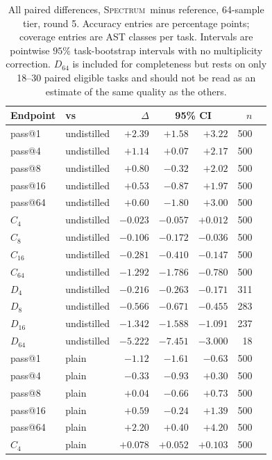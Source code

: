 \documentclass{article}
\newcommand{\method}{\textsc{Spectrum}}
\begin{document}
\begin{table}[h]
\caption{\small All paired differences, \method\ minus reference, 64-sample tier, round 5. Accuracy entries are percentage points; coverage entries are AST classes per task. Intervals are pointwise $95\%$ task-bootstrap intervals with no multiplicity correction. $D_{64}$ is included for completeness but rests on only 18--30 paired eligible tasks and should not be read as an estimate of the same quality as the others.}
\label{tab:full}
\centering\scriptsize
\begin{tabular}{llrrrrr}
\toprule
Endpoint & vs & $\Delta$ & \multicolumn{2}{c}{95\% CI} & $n$ \\
\midrule
pass@1   & undistilled & $+2.39$ & $+1.58$ & $+3.22$ & 500 \\
pass@4   & undistilled & $+1.14$ & $+0.07$ & $+2.17$ & 500 \\
pass@8   & undistilled & $+0.80$ & $-0.32$ & $+2.02$ & 500 \\
pass@16  & undistilled & $+0.53$ & $-0.87$ & $+1.97$ & 500 \\
pass@64  & undistilled & $+0.60$ & $-1.80$ & $+3.00$ & 500 \\
$C_{4}$  & undistilled & $-0.023$ & $-0.057$ & $+0.012$ & 500 \\
$C_{8}$  & undistilled & $-0.106$ & $-0.172$ & $-0.036$ & 500 \\
$C_{16}$ & undistilled & $-0.281$ & $-0.410$ & $-0.147$ & 500 \\
$C_{64}$ & undistilled & $-1.292$ & $-1.786$ & $-0.780$ & 500 \\
$D_{4}$  & undistilled & $-0.216$ & $-0.263$ & $-0.171$ & 311 \\
$D_{8}$  & undistilled & $-0.566$ & $-0.671$ & $-0.455$ & 283 \\
$D_{16}$ & undistilled & $-1.342$ & $-1.588$ & $-1.091$ & 237 \\
$D_{64}$ & undistilled & $-5.222$ & $-7.451$ & $-3.000$ & 18 \\
\midrule
pass@1   & plain & $-1.12$ & $-1.61$ & $-0.63$ & 500 \\
pass@4   & plain & $-0.33$ & $-0.93$ & $+0.30$ & 500 \\
pass@8   & plain & $+0.04$ & $-0.66$ & $+0.73$ & 500 \\
pass@16  & plain & $+0.59$ & $-0.24$ & $+1.39$ & 500 \\
pass@64  & plain & $+2.20$ & $+0.40$ & $+4.20$ & 500 \\
$C_{4}$  & plain & $+0.078$ & $+0.052$ & $+0.103$ & 500 \\

\end{tabular}
\end{table}
\end{document}
